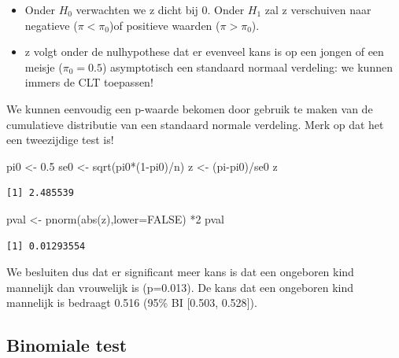 \documentclass[
  dutch,
  letterpaper,
  12pt]{book}
\newenvironment{Shaded}{\begin{snugshade}}{\end{snugshade}}
\newcommand{\AttributeTok}[1]{\textcolor[rgb]{0.40,0.45,0.13}{#1}}
\newcommand{\ConstantTok}[1]{\textcolor[rgb]{0.56,0.35,0.01}{#1}}
\newcommand{\DecValTok}[1]{\textcolor[rgb]{0.68,0.00,0.00}{#1}}
\newcommand{\FloatTok}[1]{\textcolor[rgb]{0.68,0.00,0.00}{#1}}
\newcommand{\FunctionTok}[1]{\textcolor[rgb]{0.28,0.35,0.67}{#1}}
\newcommand{\NormalTok}[1]{\textcolor[rgb]{0.00,0.23,0.31}{#1}}
\newcommand{\OtherTok}[1]{\textcolor[rgb]{0.00,0.23,0.31}{#1}}
\newcommand{\SpecialCharTok}[1]{\textcolor[rgb]{0.37,0.37,0.37}{#1}}
\theoremstyle{definition}
\theoremstyle{definition}
\theoremstyle{definition}
\theoremstyle{remark}
\begin{document}
\begin{itemize}
\item
  Onder \(H_0\) verwachten we z dicht bij 0. Onder \(H_1\) zal z
  verschuiven naar negatieve (\(\pi < \pi_0\))of positieve waarden
  (\(\pi>\pi_0\)).
\item
  z volgt onder de nulhypothese dat er evenveel kans is op een jongen of
  een meisje (\(\pi_0=0.5\)) asymptotisch een standaard normaal
  verdeling: we kunnen immers de CLT toepassen!
\end{itemize}

We kunnen eenvoudig een p-waarde bekomen door gebruik te maken van de
cumulatieve distributie van een standaard normale verdeling. Merk op dat
het een tweezijdige test is!

\begin{Shaded}
\begin{Highlighting}[]
\NormalTok{pi0 }\OtherTok{\textless{}{-}} \FloatTok{0.5}
\NormalTok{se0 }\OtherTok{\textless{}{-}} \FunctionTok{sqrt}\NormalTok{(pi0}\SpecialCharTok{*}\NormalTok{(}\DecValTok{1}\SpecialCharTok{{-}}\NormalTok{pi0)}\SpecialCharTok{/}\NormalTok{n)}
\NormalTok{z }\OtherTok{\textless{}{-}}\NormalTok{ (pi}\SpecialCharTok{{-}}\NormalTok{pi0)}\SpecialCharTok{/}\NormalTok{se0}
\NormalTok{z}
\end{Highlighting}
\end{Shaded}

\begin{verbatim}
[1] 2.485539
\end{verbatim}

\begin{Shaded}
\begin{Highlighting}[]
\NormalTok{pval }\OtherTok{\textless{}{-}} \FunctionTok{pnorm}\NormalTok{(}\FunctionTok{abs}\NormalTok{(z),}\AttributeTok{lower=}\ConstantTok{FALSE}\NormalTok{) }\SpecialCharTok{*}\DecValTok{2}
\NormalTok{pval}
\end{Highlighting}
\end{Shaded}

\begin{verbatim}
[1] 0.01293554
\end{verbatim}

We besluiten dus dat er significant meer kans is dat een ongeboren kind
mannelijk dan vrouwelijk is (p=0.013). De kans dat een ongeboren kind
mannelijk is bedraagt 0.516 (95\% BI {[}0.503, 0.528{]}).

\subsection{Binomiale test}\label{sec-binom}
\end{document}

